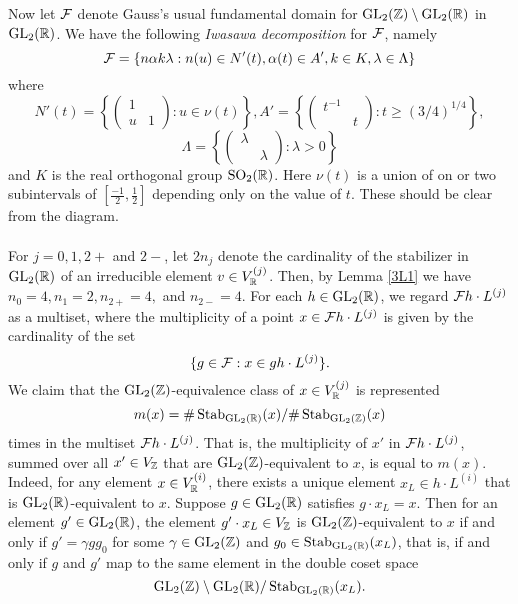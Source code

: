 \documentclass[12pt,amsfont]{amsart}
\begin{document}
Now let $\mathcal{F}$ denote Gauss's usual fundamental domain for $\operatorname{GL}_2({\mathbb Z}) \setminus \operatorname{GL}_2({\mathbb R})$ in $\operatorname{GL}_2({\mathbb R})$. We have the following \emph{Iwasawa decomposition} for $\mathcal{F}$, namely 
\[\mathcal{F} = \{n \alpha k \lambda: n(u) \in N'(t), \alpha(t) \in A', k \in K, \lambda \in \Lambda\}\]
where
\[N'(t) = \left\{ \begin{pmatrix} 1 & \\ u & 1 \end{pmatrix} : u \in \nu(t)\right \}, A' = \left\{ \begin{pmatrix} t^{-1} & \\ & t \end{pmatrix} : t \geq (3/4)^{1/4}\right \}, \]
\[\Lambda = \left \{ \begin{pmatrix} \lambda & \\ & \lambda \end{pmatrix} : \lambda > 0 \right \} \]
and $K$ is the real orthogonal group $\operatorname{SO}_2({\mathbb R})$. Here $\nu(t)$ is a union of on or two subintervals of $\left[ \frac{-1}{2}, \frac{1}{2} \right]$ depending only on the value of $t$. These should be clear from the diagram. \\ \\
For $j = 0, 1, 2+$ and $2-$, let $2 n_j$ denote the cardinality of the stabilizer in $\operatorname{GL}_2({\mathbb R})$ of an irreducible element $v \in V_{\mathbb R}^{(j)}$. Then, by Lemma \ref{3L1} we have $n_0 = 4, n_1 = 2, n_{2+} = 4, $ and $n_{2-} = 4$.  For each $h \in \operatorname{GL}_2({\mathbb R})$, we regard $\mathcal{F} h \cdot L^{(j)}$ as a multiset, where the multiplicity of a point $x \in \mathcal{F} h \cdot L^{(j)}$ is given by the cardinality of the set 
\[\{g \in \mathcal{F} : x \in gh \cdot L^{(j)}\}.\]
We claim that the $\operatorname{GL}_2({\mathbb Z})$-equivalence class of $x \in V_{\mathbb R}^{(j)}$ is represented 
\[m(x) = \# \operatorname{Stab}_{\operatorname{GL}_2({\mathbb R})} (x) / \# \operatorname{Stab}_{\operatorname{GL}_2({\mathbb Z})} (x) \]
times in the multiset $\mathcal{F} h \cdot L^{(j)}$. That is, the multiplicity of $x'$ in $\mathcal{F} h \cdot L^{(j)}$, summed over all $x' \in V_{\mathbb Z}$ that are $\operatorname{GL}_2({\mathbb Z})$-equivalent to $x$, is equal to $m(x)$. Indeed, for any element $x \in V_{\mathbb R}^{(i)}$, there exists a unique element $x_L \in h \cdot L^{(i)}$ that is $\operatorname{GL}_2({\mathbb R})$-equivalent to $x$. Suppose $g \in \operatorname{GL}_2({\mathbb R})$ satisfies $g \cdot x_L = x$. Then for an element $g' \in \operatorname{GL}_2({\mathbb R})$, the element $g' \cdot x_L \in V_{\mathbb Z}$ is $\operatorname{GL}_2({\mathbb Z})$-equivalent to $x$ if and only if $g' = \gamma g g_0$ for some $\gamma \in \operatorname{GL}_2({\mathbb Z})$ and $g_0 \in \operatorname{Stab}_{\operatorname{GL}_2({\mathbb R})}(x_L)$, that is, if and only if $g$ and $g'$ map to the same element in the double coset space
\[\operatorname{GL}_2({\mathbb Z}) \setminus \operatorname{GL}_2({\mathbb R}) / \operatorname{Stab}_{\operatorname{GL}_2({\mathbb R})}(x_L).\]  
\end{document}
